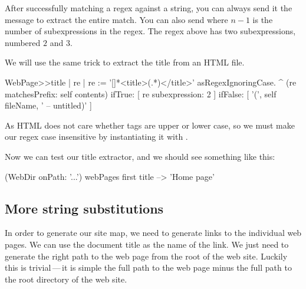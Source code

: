 \documentclass[a4paper,10pt,twoside]{book}
\begin{document}
After successfully matching a regex against a string, you can always send it the message  to extract the entire match.  You can also send  where $n-1$ is the number of subexpressions in the regex. The regex above has two subexpressions, numbered $2$ and $3$.

We will use the same trick to extract the title from an HTML file.


\begin{code}{}
WebPage>>title
	| re |
	re := '[\w\W]*<title>(.*)</title>' asRegexIgnoringCase.
	^ (re matchesPrefix: self contents)
		ifTrue: [ re subexpression: 2 ]
		ifFalse: [ '(', self fileName, ' -- untitled)' ]
\end{code}

As HTML does not care whether tags are upper or lower case, so we must make our regex case insensitive by instantiating it with .


Now we can test our title extractor, and we should see something like this:

\begin{code}{}
(WebDir onPath: '...') webPages first title --> 'Home page'
\end{code}

\subsection{More string substitutions}

In order to generate our site map, we need to generate links to the individual web pages.
We can use the document title as the name of the link.  We just need to generate the right path to the web page from the root of the web site.
Luckily this is trivial\,---\,it is simple the full path to the web page minus the full path to the root directory of the web site.
\end{document}

